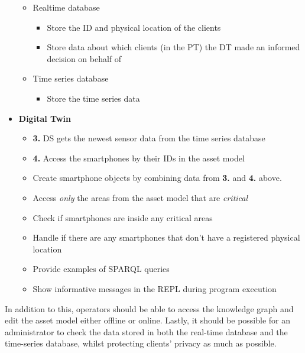 \documentclass{article}
\begin{document}
\begin{itemize}
    \begin{itemize}
        \item Realtime database
        \begin{itemize}
            \item Store the ID and physical location of the clients
            \item Store data about which clients (in the PT) the DT made an informed decision on behalf of
        \end{itemize}
        \item Time series database
        \begin{itemize}
            \item Store the time series data
        \end{itemize}
    \end{itemize}
    \item \textbf{Digital Twin}
    \begin{itemize} 
        \item \textbf{3.} DS gets the newest sensor data from the time series database
        \item \textbf{4.} Access the smartphones by their IDs in the asset model
        \item Create smartphone objects by combining data from \textbf{3.} and \textbf{4.} above. 
        \item Access \emph{only} the areas from the asset model that are \emph{critical}
        \item Check if smartphones are inside any critical areas
        \item Handle if there are any smartphones that don't have a registered physical location
        \item Provide examples of SPARQL queries
        \item Show informative messages in the REPL during program execution
    \end{itemize}
\end{itemize}

In addition to this, operators should be able to access the knowledge graph and edit the asset model either offline or online. Lastly, it should be possible for an administrator to check the data stored in both the real-time database and the time-series database, whilst protecting clients' privacy as much as possible.

\newpage
\end{document}
